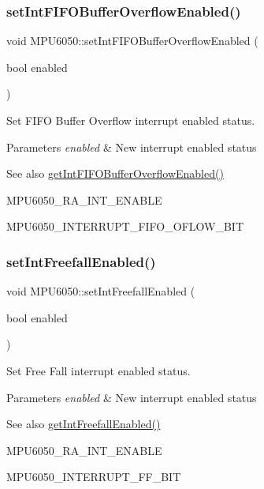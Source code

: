 \subsubsection{\texorpdfstring{setIntFIFOBufferOverflowEnabled()}{setIntFIFOBufferOverflowEnabled()}}
{\footnotesize\ttfamily void M\+P\+U6050\+::set\+Int\+F\+I\+F\+O\+Buffer\+Overflow\+Enabled (\begin{DoxyParamCaption}\item[{bool}]{enabled }\end{DoxyParamCaption})}

Set F\+I\+FO Buffer Overflow interrupt enabled status. 
\begin{DoxyParams}{Parameters}
{\em enabled} & New interrupt enabled status \\
\hline
\end{DoxyParams}
\begin{DoxySeeAlso}{See also}
\mbox{\hyperlink{class_m_p_u6050_a55f99c88cc84901f245924ed5e3fe47e}{get\+Int\+F\+I\+F\+O\+Buffer\+Overflow\+Enabled()}} 

M\+P\+U6050\+\_\+\+R\+A\+\_\+\+I\+N\+T\+\_\+\+E\+N\+A\+B\+LE 

M\+P\+U6050\+\_\+\+I\+N\+T\+E\+R\+R\+U\+P\+T\+\_\+\+F\+I\+F\+O\+\_\+\+O\+F\+L\+O\+W\+\_\+\+B\+IT 
\end{DoxySeeAlso}
\mbox{\label{class_m_p_u6050_a01a24a05f06463d5277e1670d6260e03}} 
\subsubsection{\texorpdfstring{setIntFreefallEnabled()}{setIntFreefallEnabled()}}
{\footnotesize\ttfamily void M\+P\+U6050\+::set\+Int\+Freefall\+Enabled (\begin{DoxyParamCaption}\item[{bool}]{enabled }\end{DoxyParamCaption})}

Set Free Fall interrupt enabled status. 
\begin{DoxyParams}{Parameters}
{\em enabled} & New interrupt enabled status \\
\hline
\end{DoxyParams}
\begin{DoxySeeAlso}{See also}
\mbox{\hyperlink{class_m_p_u6050_a500bb2df2e46eaecd3fb2ba7304a5ed3}{get\+Int\+Freefall\+Enabled()}} 

M\+P\+U6050\+\_\+\+R\+A\+\_\+\+I\+N\+T\+\_\+\+E\+N\+A\+B\+LE 

M\+P\+U6050\+\_\+\+I\+N\+T\+E\+R\+R\+U\+P\+T\+\_\+\+F\+F\+\_\+\+B\+IT 
\end{DoxySeeAlso}
\mbox{\label{class_m_p_u6050_af238656844a3727fa96a8d434b55473e}} 
